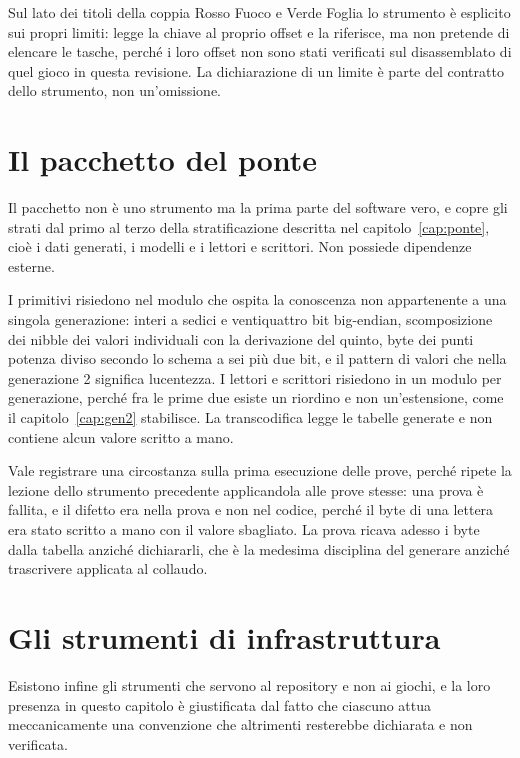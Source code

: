 Sul lato dei titoli della coppia Rosso Fuoco e Verde Foglia lo strumento è esplicito sui propri limiti: legge la chiave al proprio offset e la riferisce, ma non pretende di elencare le tasche, perché i loro offset non sono stati verificati sul disassemblato di quel gioco in questa revisione. La dichiarazione di un limite è parte del contratto dello strumento, non un'omissione.

\section{Il pacchetto del ponte}

Il pacchetto non è uno strumento ma la prima parte del software vero, e copre gli strati dal primo al terzo della stratificazione descritta nel capitolo~\ref{cap:ponte}, cioè i dati generati, i modelli e i lettori e scrittori. Non possiede dipendenze esterne.

I primitivi risiedono nel modulo che ospita la conoscenza non appartenente a una singola generazione: interi a sedici e ventiquattro bit big-endian, scomposizione dei nibble dei valori individuali con la derivazione del quinto, byte dei punti potenza diviso secondo lo schema a sei più due bit, e il pattern di valori che nella generazione 2 significa lucentezza. I lettori e scrittori risiedono in un modulo per generazione, perché fra le prime due esiste un riordino e non un'estensione, come il capitolo~\ref{cap:gen2} stabilisce. La transcodifica legge le tabelle generate e non contiene alcun valore scritto a mano.

Vale registrare una circostanza sulla prima esecuzione delle prove, perché ripete la lezione dello strumento precedente applicandola alle prove stesse: una prova è fallita, e il difetto era nella prova e non nel codice, perché il byte di una lettera era stato scritto a mano con il valore sbagliato. La prova ricava adesso i byte dalla tabella anziché dichiararli, che è la medesima disciplina del generare anziché trascrivere applicata al collaudo.

\section{Gli strumenti di infrastruttura}

Esistono infine gli strumenti che servono al repository e non ai giochi, e la loro presenza in questo capitolo è giustificata dal fatto che ciascuno attua meccanicamente una convenzione che altrimenti resterebbe dichiarata e non verificata.

